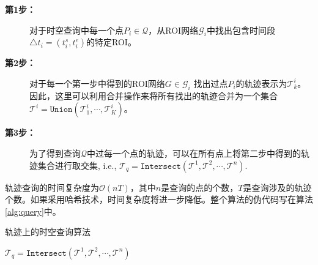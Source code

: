 \begin{description}
\item[\textbf{第1步：}]对于时空查询中每一个点$P_i \in \mathcal{Q}$，从ROI网络$\mathcal{G}_i$中找出包含时间段$\triangle t_i = (t^s_i, t^e_i)$的特定ROI。
\vspace{1mm}

\item[\textbf{第2步：}]对于每一个第一步中得到的ROI网络$G \in \mathcal{G}_i$ 找出过点$P_i$的轨迹表示为$\mathcal{T}^i_k$。因此，这里可以利用合并操作来将所有找出的轨迹合并为一个集合$\mathcal{T}^i = \texttt{Union}(\mathcal{T}^i_1, \cdots, \mathcal{T}^i_K)$。
\vspace{1mm}

\item[\textbf{第3步：}]为了得到查询$\mathcal{Q}$中过每一个点的轨迹，可以在所有点上将第二步中得到的轨迹集合进行取交集, i.e., $\mathcal{T}_q = \texttt{Intersect}(\mathcal{T}^1, \mathcal{T}^2, \cdots, \mathcal{T}^n).$
\end{description}

轨迹查询的时间复杂度为$\mathcal{O}(nT)$，其中$n$是查询的点的个数，$T$是查询涉及的轨迹个数。如果采用哈希技术，时间复杂度将进一步降低。整个算法的伪代码写在算法\ref{alg:query}中。


\begin{algorithm}[!t]
\caption{轨迹上的时空查询算法}
\label{alg:query}
\small{
\BlankLine
{}
$\mathcal{T}_q = \texttt{Intersect}(\mathcal{T}^1, \mathcal{T}^2, \cdots, \mathcal{T}^n)$\;
}
\end{algorithm}

